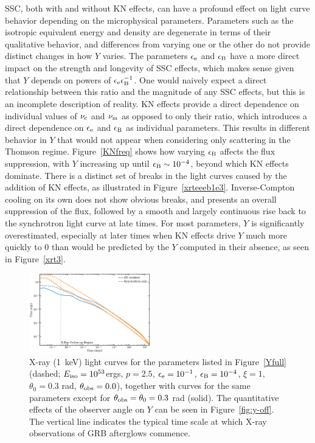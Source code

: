 \documentclass[fleqn,usenatbib]{mnras}
\begin{document}
SSC, both with and without KN effects, can have a profound effect on light curve behavior depending on the microphysical parameters. Parameters such as the isotropic equivalent energy and density are degenerate in terms of their qualitative behavior, and differences from varying one or the other do not provide distinct changes in how $Y$ varies. The parameters $\epsilon_{\rm e}$ and $\epsilon_{\rm B}$ have a more direct impact on the strength and longevity of SSC effects, which makes sense given that $Y$ depends on powers of $\epsilon_{\rm e}\epsilon_{\rm B}^{-1}$. One would naively expect a direct relationship between this ratio and the magnitude of any SSC effects, but this is an incomplete description of reality. KN effects provide a direct dependence on individual values of $\nu_{\rm c}$ and $\nu_{\rm m}$ as opposed to only their ratio, which introduces a direct dependence on $\epsilon_{\rm e}$ and $\epsilon_{\rm B}$ as individual parameters. This results in different behavior in $Y$ that would not appear when considering only scattering in the Thomson regime. Figure~\ref{KNfreq} shows how varying $\epsilon_{\rm B}$ affects the flux suppression, with $Y$ increasing up until $\epsilon_{\rm B} \sim 10^{-4}$, beyond which KN effects dominate. There is a distinct set of breaks in the light curves caused by the addition of KN effects, as illustrated in Figure~\ref{xrteeeb1e3}. Inverse-Compton cooling on its own does not show obvious breaks, and presents an overall suppression of the flux, followed by a smooth and largely continuous rise back to the synchrotron light curve at late times. For most parameters, $Y$ is significantly overestimated, especially at later times when KN effects drive $Y$ much more quickly to 0 than would be predicted by the $Y$ computed in their absence, as seen in Figure~\ref{xrt3}.

\begin{figure}
    \includegraphics[width=0.47\textwidth]{images/XRT-on-vs-off.png}
    \caption{X-ray (1~keV) light curves for the parameters listed in Figure~\ref{Yfull} (dashed; $E_{\rm iso}=10^{53}$ergs, $p=2.5$, $\epsilon_{\rm e}=10^{-1}$, $\epsilon_{\rm B}=10^{-4}$, $\xi=1$, $\theta_0=0.3$ rad, $\theta_{\rm obs}=0.0$), together with curves for the same parameters except for $\theta_{\rm obs}=\theta_0=0.3$ rad (solid). The quantitative effects of the observer angle on $Y$ can be seen in Figure~\ref{fig:y-off}. The vertical line indicates the typical time scale at which X-ray observations of GRB afterglows commence.}
    \label{xrtonoff}
\end{figure}
\end{document}
